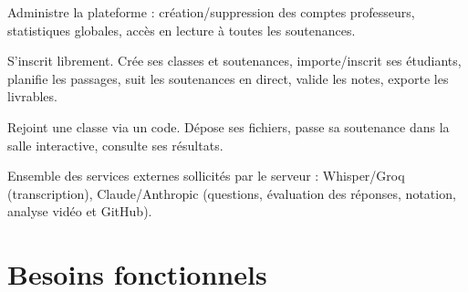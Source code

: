 \documentclass[12pt,a4paper]{report}
\begin{document}
\begin{description}[style=nextline]
  \item[Superadmin] Administre la plateforme : création/suppression des comptes
        professeurs, statistiques globales, accès en lecture à toutes les
        soutenances.
  \item[Professeur] S'inscrit librement. Crée ses classes et soutenances,
        importe/inscrit ses étudiants, planifie les passages, suit les
        soutenances en direct, valide les notes, exporte les livrables.
  \item[Étudiant] Rejoint une classe via un code. Dépose ses fichiers, passe
        sa soutenance dans la salle interactive, consulte ses résultats.
  \item[Système IA (acteur secondaire)] Ensemble des services externes
        sollicités par le serveur : Whisper/Groq (transcription), Claude/Anthropic
        (questions, évaluation des réponses, notation, analyse vidéo et GitHub).
\end{description}

\section{Besoins fonctionnels}
\end{document}
